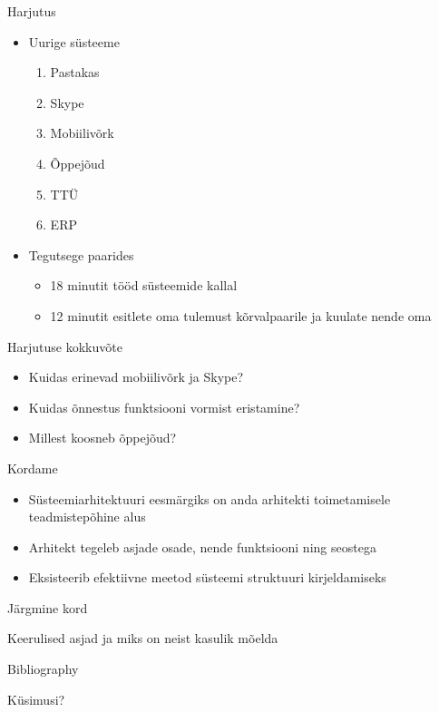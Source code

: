 \documentclass{beamer}
\begin{document}
\begin{frame}{Harjutus}

\begin{itemize}
	\item Uurige süsteeme
	\begin{enumerate}
		\item Pastakas
		\item Skype
		\item Mobiilivõrk
		\item Õppejõud
		\item TTÜ
		\item ERP
\end{enumerate}
	\item Tegutsege paarides
	\begin{itemize}
		\item 18 minutit tööd süsteemide kallal
		\item 12 minutit esitlete oma tulemust kõrvalpaarile ja kuulate nende oma
	\end{itemize}
\end{itemize}
\end{frame}


\begin{frame}{Harjutuse kokkuvõte}
	\begin{itemize}
		\item Kuidas erinevad mobiilivõrk ja Skype?
		\item Kuidas õnnestus funktsiooni vormist eristamine?
		\item Millest koosneb õppejõud?
	\end{itemize}
\end{frame}


\begin{frame}{Kordame}
	\begin{itemize}
		\item Süsteemiarhitektuuri eesmärgiks on anda arhitekti toimetamisele teadmistepõhine alus
		\item Arhitekt tegeleb asjade osade, nende funktsiooni ning seostega
		\item Eksisteerib efektiivne meetod süsteemi struktuuri kirjeldamiseks
	\end{itemize}
\end{frame}

\begin{frame}{Järgmine kord}
\begin{center}
Keerulised asjad ja miks on neist kasulik mõelda
\end{center}
\end{frame}

\begin{frame}{Bibliography}
	
	
\end{frame}

\begin{frame}[standout]
Küsimusi?
\end{frame}
\end{document}
